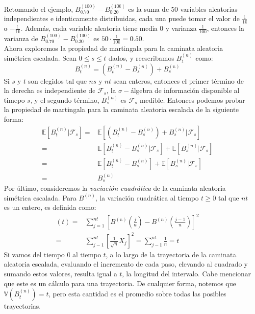 \documentclass[11pt,notitlepage]{article}
\begin{document}
Retomando el ejemplo, $B^{(100)}_{0.70} - B^{(100)}_{0.20}$  es la suma de $50$ variables aleatorias independientes e identicamente distribuidas, cada una puede tomar el valor de $\frac{1}{10}$ o $-\frac{1}{10}$. Además, cada variable aleatoria tiene media $0$ y varianza $\frac{1}{100}$, entonces la varianza de $B^{(100)}_{0.70} - B^{(100)}_{0.20}$ es $50\cdot \frac{1}{100}= 0.50$.\\ \linebreak
Ahora exploremos la propiedad de martingala para la caminata aleatoria simétrica escalada. Sean $0\leq s\leq t$ dados, y reescribamos $B^{(n)}_{t}$ como:
\[B^{(n)}_{t} = (B^{(n)}_{t}-B^{(n)}_{s}) + B^{(n)}_{s}\]Si $s$ y $t$ son elegidos tal que $ns$ y $nt$ sean enteros, entonces el primer término de la derecha es independiente de $\mathcal{F}_{s}$, la $\sigma-$álgebra de información disponible al timepo $s$, y el segundo término, $B^{(n)}_{s}$ es $\mathcal{F}_{s}$-medible. Entonces podemos probar la propiedad de martingala para la caminata aleatoria escalada de la siguiente forma:
\begin{align*}
    \mathbb{E}[B^{(n)}_{t} | \mathcal{F}_{s}] = & \mathbb{E}[(B^{(n)}_{t}-B^{(n)}_{s}) + B^{(n)}_{s}| \mathcal{F}_{s}]\\
    = & \mathbb{E}[B^{(n)}_{t}-B^{(n)}_{s}| \mathcal{F}_{s}] + \mathbb{E}[ B^{(n)}_{s} | \mathcal{F}_{s}]\\
    = & \mathbb{E}[B^{(n)}_{t}-B^{(n)}_{s}] + \mathbb{E}[ B^{(n)}_{s} | \mathcal{F}_{s}]\\
    = &  B^{(n)}_{s}
\end{align*}
\linebreak
Por último, consideremos la \textit{vaciación cuadrática} de la caminata aleatoria simétrica escalada. Para $B^{(n)}$, la variación cuadrática al tiempo $t \geq 0$ tal que $nt$ es un entero, es definida como:
\begin{align*}
    [B^{(n)}, B^{(n)}](t) = & \sum _{j = 1}^{nt} \left[B^{(n)}\left(\frac{j}{n}\right) - B^{(n)}\left(\frac{j-1}{n}\right)\right]^2\\
     = & \sum_{j-1}^{nt}\left[\frac{1}{\sqrt{n}}X_j\right]^2 = \sum_{j-1}^{nt} \frac{1}{n} = t
\end{align*}
Si vamos del tiempo $0$ al tiempo $t$, a lo largo de la trayectoria de la caminata aleatoria escalada, evaluando el incremento de cada paso, elevando al cuadrado y sumando estos valores, resulta igual a $t$, la longitud del intervalo. Cabe mencionar que este es un cálculo para una trayectoria. De cualquier forma, notemos que $\mathbb{V}(B^{(n)}_{t})=t$, pero esta cantidad es el promedio sobre todas las posibles trayectorias.
\end{document}
